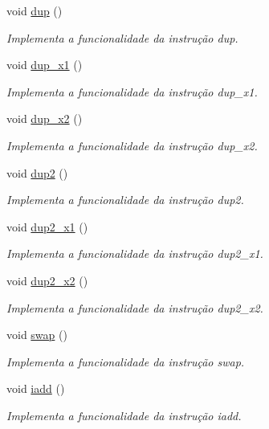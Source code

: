 \begin{DoxyCompactItemize}
void \hyperlink{classOperations_a0cba4ff895f2e3908eea5b39305481a4}{dup} ()
\begin{DoxyCompactList}\small\item\em Implementa a funcionalidade da instrução dup. \end{DoxyCompactList}\item 
void \hyperlink{classOperations_a46bab81a4a4bd1eda1c89b0b74f9e014}{dup\+\_\+x1} ()
\begin{DoxyCompactList}\small\item\em Implementa a funcionalidade da instrução dup\+\_\+x1. \end{DoxyCompactList}\item 
void \hyperlink{classOperations_adbba871c60bfb34344f2012936beeb25}{dup\+\_\+x2} ()
\begin{DoxyCompactList}\small\item\em Implementa a funcionalidade da instrução dup\+\_\+x2. \end{DoxyCompactList}\item 
void \hyperlink{classOperations_a7cb6985281b1ab32e905e4726ef2c964}{dup2} ()
\begin{DoxyCompactList}\small\item\em Implementa a funcionalidade da instrução dup2. \end{DoxyCompactList}\item 
void \hyperlink{classOperations_a57b0cf4d7a133bf35b39fcf8d6e15511}{dup2\+\_\+x1} ()
\begin{DoxyCompactList}\small\item\em Implementa a funcionalidade da instrução dup2\+\_\+x1. \end{DoxyCompactList}\item 
void \hyperlink{classOperations_ab49247b3958376b27e8347e053dfe7de}{dup2\+\_\+x2} ()
\begin{DoxyCompactList}\small\item\em Implementa a funcionalidade da instrução dup2\+\_\+x2. \end{DoxyCompactList}\item 
void \hyperlink{classOperations_ad800d04ce11806455dd5b84a7ecd6144}{swap} ()
\begin{DoxyCompactList}\small\item\em Implementa a funcionalidade da instrução swap. \end{DoxyCompactList}\item 
void \hyperlink{classOperations_a12d5933f0d0c91c578b76edb1971a2be}{iadd} ()
\begin{DoxyCompactList}\small\item\em Implementa a funcionalidade da instrução iadd. \end{DoxyCompactList}\item 

\end{DoxyCompactItemize}
